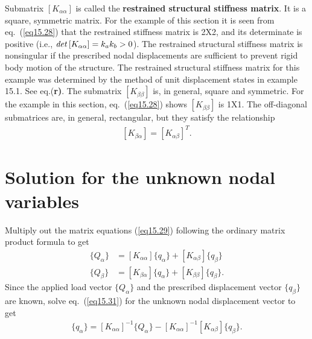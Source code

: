 \documentclass{AeroStructure-ERJohnson}
\begin{document}
Submatrix $\left[K_{\alpha\alpha}\right]$ is called the \textbf{restrained structural stiffness matrix}. It is a square, symmetric matrix. For the example of this section it is seen from eq.~(\ref{eq15.28}) that the restrained stiffness matrix is 2X2, and its determinate is positive (i.e., $\operatorname{\it det}\left[K_{\alpha\alpha}\right]=k_{a} k_{b}>0$). The restrained structural stiffness matrix is nonsingular if the prescribed nodal displacements are sufficient to prevent rigid body motion of the structure. The restrained structural stiffness matrix for this example was determined by the method of unit displacement states in example 15.1. See eq.(\textbf{r)}. The submatrix $\left[K_{\beta \beta}\right]$ is, in general, square and symmetric. For the example in this section, eq.~(\ref{eq15.28}) shows $\left[K_{\beta \beta}\right]$ is 1X1. The off-diagonal submatrices are, in general, rectangular, but they satisfy the relationship
\begin{align}\label{eq15.30}
[K_{\beta \alpha}]=[K_{\alpha \beta}]^{T}.
\end{align}
\section{Solution for the unknown nodal variables}\label{sec15.5}

Multiply out the matrix equations (\ref{eq15.29}) following the ordinary matrix product formula to get
\begin{align}\label{eq15.31}
\{Q_{\alpha}\} &=[K_{\alpha\alpha}]\{q_{\alpha}\}+[K_{\alpha \beta}]\{q_{\beta}\}\\
\label{eq15.32}
\{Q_{\beta}\} &=[K_{\beta \alpha}]\{q_{\alpha}\}+[K_{\beta \beta}]\{q_{\beta}\}.
\end{align}
Since the applied load vector $\{Q_{\alpha}\}$ and the prescribed displacement vector $\{q_{\beta}\}$ are known, solve eq.~(\ref{eq15.31}) for the unknown nodal displacement vector to get
\begin{align}\label{eq15.33}
\{q_{\alpha}\}=[K_{\alpha \alpha}]^{-1}\{Q_{\alpha}\}-[K_{\alpha \alpha}]^{-1}[K_{\alpha \beta}]\{q_{\beta}\}.
\end{align}
\end{document}

